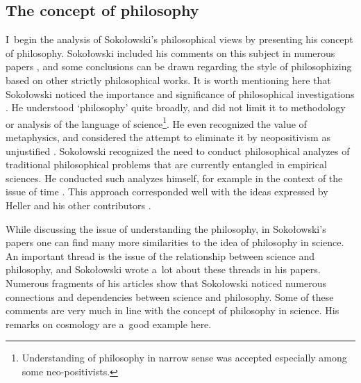 \documentclass[%
  manuscript=article,
  year=2024,
  volume=77,
  doi=10.59203/zfn.77.689,
]{zfn}
\begin{document}
\subsection{ The concept of philosophy}



I~begin the analysis of Sokołowski's philosophical views by presenting his concept of philosophy. Sokołowski included his comments on this subject in numerous papers 
\parencites[][]{Sokoowski1986Pluralizm}[][]{Sokoowski1989Gos}[][]{Sokoowski1990Nadwyzkowosc}[][]{Sokoowski2014Czy}[][]{Sokoowski2017Kopoty}, %
 and some conclusions can be drawn regarding the style of philosophizing based on other strictly philosophical works. It is worth mentioning here that Sokołowski noticed the importance and significance of philosophical investigations 
\parencite[][p.63]{Sokoowski1990Nadwyzkowosc}. %
 He understood ‘philosophy' quite broadly, and did not limit it to methodology or analysis of the language of science\footnote{Understanding of philosophy in narrow sense was accepted especially among some neo-positivists.}. He even recognized the value of metaphysics, and considered the attempt to eliminate it by neopositivism as unjustified 
\parencite[][p.198]{Sokoowski1986Pluralizm}. %
 Sokołowski recognized the need to conduct philosophical analyzes of traditional philosophical problems that are currently entangled in empirical sciences. He conducted such analyzes himself, for example in the context of the issue of time 
\parencite[][]{Sokoowski2000Czas}. %
 This approach corresponded well with the ideas expressed by Heller and his other contributors 
\parencites[][]{Heller1999Jak}[][]{Polak2019Philosophy}.%




While discussing the issue of understanding the philosophy, in Sokołowski's papers one can find many more similarities to the idea of philosophy in science. An important thread is the issue of the relationship between science and philosophy, and Sokołowski wrote a~lot about these threads in his papers. Numerous fragments of his articles show that Sokołowski noticed numerous connections and dependencies between science and philosophy. Some of these comments are very much in line with the concept of philosophy in science. His remarks on cosmology are a~good example here.
\end{document}
